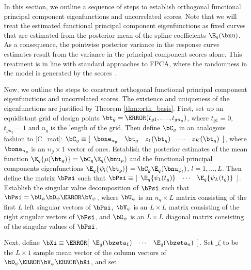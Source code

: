 \documentclass[ba]{imsart}
\numberwithin{equation}{section}
\theoremstyle{plain}
\def\numu{\bnu_\mu}
\newcommand\nupsi[1]{\bnu_{\psi_{#1}}}
\begin{document}
In this section, we outline a sequence of steps to establish orthogonal
functional principal component eigenfunctions and uncorrelated scores.
Note that we will treat the estimated functional principal component eigenfunctions as fixed curves that
are estimated from the posterior mean of the spline coefficients $\E_q (\bnu)$. As a consequence, the pointwise
posterior variance in the response curve estimates result from the variance in the principal component scores
alone. This treatment is in line with standard approaches to FPCA, where the randomness in the model is
generated by the scores  \citep[e.g.][]{yao05, benko09}.

Now, we outline the steps to construct orthogonal functional principal component eigenfunctions and
uncorrelated scores. The existence and uniqueness of the eigenfunctions are justified by Theorem \ref{thm:orth_basis}.
First, set up an equidistant grid of design points $\bt_g = \T{(t_{g1}, \dots, t_{gn_g})}$,
where $t_{g1} = 0$, $t_{gn_g} = 1$ and $n_g$ is the length of the grid. Then define $\bC_g$ in an analogous fashion
to \eqref{C_mat}: $\bC_g \equiv [ \begin{array}{ccccc} \bone_{n_g} & \bt_g & z_1 (\bt_g) & \cdots & z_K (\bt_g)
\end{array}]$, where $\bone_{n_g}$ is an $n_g \times 1$ vector of ones.
Establish the posterior estimates of the mean function $\E_q \{ \mu (\bt_g) \} = \bC_g \E_q (\numu)$
and the functional principal components eigenfunctions $\E_q \{ \psi_l (\bt_g) \} = \bC_g \E_q (\nupsi{l})$,
$l = 1, \dots, L$. Then define the matrix $\bPsi$ such that
$\bPsi \equiv [\begin{array}{ccc} \E_q \{ \psi_1 (t_g) \} & \cdots & \E_q \{ \psi_L (t_g) \} \end{array}]$.
Establish the singular value decomposition of $\bPsi$ such that $\bPsi = \bU_\psi \bD_\psi \T{\bV}_\psi$,
where $\bU_\psi$ is an $n_g \times L$ matrix consisting of the first $L$ left singular vectors of $\bPsi$,
$\bV_\psi$ is an $L \times L$ matrix consisting of the right singular vectors of $\bPsi$, and
$\bD_\psi$ is an $L \times L$ diagonal matrix consisting of the singular values of $\bPsi$.

Next, define $\bXi \equiv \T{[\begin{array}{ccc} \E_q (\bzeta_1) & \cdots & \E_q (\bzeta_n) \end{array}]}$.
Set $\bm_\zeta$ to be the $L \times 1$ sample mean vector of the column vectors of
$\bD_\psi \T{\bV}_\psi \T{\bXi}$, and set
\end{document}
